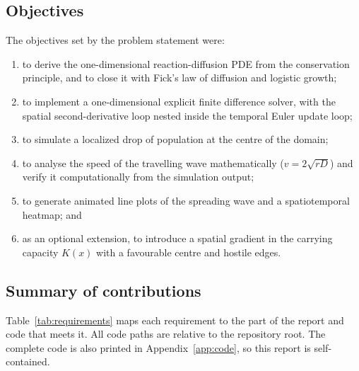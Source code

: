 \documentclass[11pt,a4paper]{article}
\begin{document}
\subsection{Objectives}
The objectives set by the problem statement were:
\begin{enumerate}
  \item to derive the one-dimensional reaction-diffusion PDE from the conservation principle, and
        to close it with Fick's law of diffusion and logistic growth;
  \item to implement a one-dimensional explicit finite difference solver, with the spatial
        second-derivative loop nested inside the temporal Euler update loop;
  \item to simulate a localized drop of population at the centre of the domain;
  \item to analyse the speed of the travelling wave mathematically ($v=2\sqrt{rD}$) and verify it
        computationally from the simulation output;
  \item to generate animated line plots of the spreading wave and a spatiotemporal heatmap; and
  \item as an optional extension, to introduce a spatial gradient in the carrying capacity $K(x)$
        with a favourable centre and hostile edges.
\end{enumerate}

\subsection{Summary of contributions}
Table~\ref{tab:requirements} maps each requirement to the part of the report and code that
meets it. All code paths are relative to the repository root. The complete code is also printed in Appendix~\ref{app:code}, so this report is self-contained.
\end{document}
